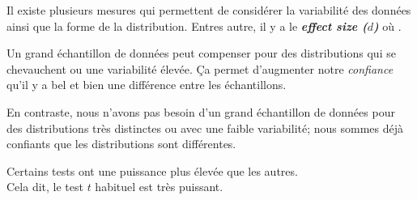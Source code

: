 \documentclass[french]{article}
\begin{document}
\begin{multicols*}{2}
\begin{definitionNOHFILLsub}
\begin{itemize}
\begin{center}
		\end{center}
\end{itemize}
\end{definitionNOHFILLsub}

Il existe plusieurs mesures qui permettent de considérer la variabilité des données ainsi que la forme de la distribution. Entres autre, il y a le \og \textit{\textbf{effect size ($d$)}} \fg{} où .

\begin{definitionNOHFILLsub}
Un grand échantillon de données peut compenser pour des distributions qui se chevauchent ou une variabilité élevée. Ça permet d'augmenter notre \textit{confiance} qu'il y a bel et bien une différence entre les échantillons. 

\bigskip

En contraste, nous n'avons pas besoin d'un grand échantillon de données pour des distributions très distinctes ou avec une faible variabilité; nous sommes déjà confiants que les distributions sont différentes.
\end{definitionNOHFILLsub}

\begin{definitionNOHFILLsub}
Certains tests ont une puissance plus élevée que les autres. \\
Cela dit, le test $t$ habituel est très puissant.
\end{definitionNOHFILLsub}




\end{multicols*}
\end{document}
